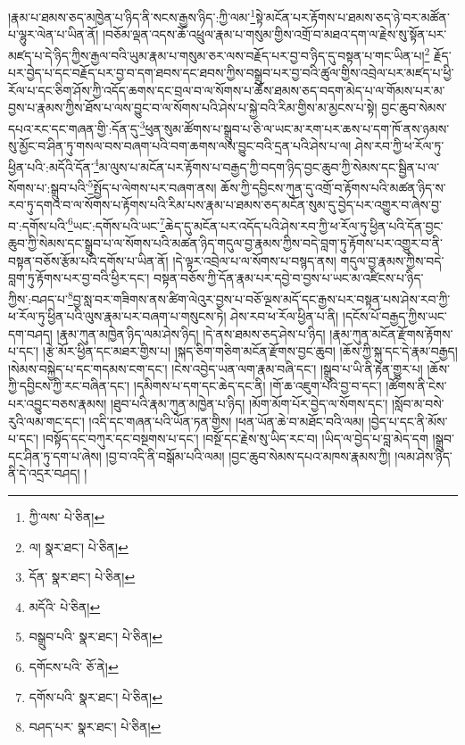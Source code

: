 །རྣམ་པ་ཐམས་ཅད་མཁྱེན་པ་ཉིད་ནི་སངས་རྒྱས་ཉིད་:ཀྱི་ལམ་\footnote{ཀྱི་ལས་  པེ་ཅིན། }སྟེ་མངོན་པར་རྟོགས་པ་ཐམས་ཅད་ཉེ་བར་མཚོན་པ་ལྷུར་ལེན་པ་ཡིན་ནོ། །བཅོམ་ལྡན་འདས་ཆོ་འཕྲུལ་རྣམ་པ་གསུམ་གྱིས་འགྲོ་བ་མཐའ་དག་ལ་རྗེས་སུ་སྟོན་པར་མཛད་པ་དེ་ཉིད་ཀྱིས་རྒྱལ་བའི་ཡུམ་རྣམ་པ་གསུམ་ཅར་ལས་བརྗོད་པར་བྱ་བ་ཉིད་དུ་བསྟན་པ་གང་ཡིན་པ།\footnote{ལ།  སྣར་ཐང་།  པེ་ཅིན། } རྗོད་པར་བྱེད་པ་དང་བརྗོད་པར་བྱ་བ་དག་ཐབས་དང་ཐབས་ཀྱིས་བསྒྲུབ་པར་བྱ་བའི་ཚུལ་གྱིས་འབྲེལ་པར་མཛད་པ་ཕྱི་རོལ་པ་དང་ཅིག་ཤོས་ཀྱི་འདོད་ཆགས་དང་བྲལ་བ་ལ་སོགས་པ་ཆོས་ཐམས་ཅད་བདག་མེད་པ་ལ་གོམས་པར་མ་བྱས་པ་རྣམས་ཀྱིས་ཐོས་པ་ལས་བྱུང་བ་ལ་སོགས་པའི་ཤེས་པ་སྐྱེ་བའི་རིམ་གྱིས་མ་མྱངས་པ་སྟེ། བྱང་ཆུབ་སེམས་དཔའ་རང་དང་གཞན་གྱི་:དོན་དུ་\footnote{དོན་  སྣར་ཐང་།  པེ་ཅིན། }ཕུན་སུམ་ཚོགས་པ་སྒྲུབ་པ་ཅི་ལ་ཡང་མ་རག་པར་ཆས་པ་དག་ཁོ་ནས་ཉམས་སུ་མྱོང་བ་ཤིན་ཏུ་གསལ་བས་བཞག་པའི་བག་ཆགས་ལས་བྱུང་བའི་དྲན་པའི་ཤེས་པ་ལ། ཤེས་རབ་ཀྱི་ཕ་རོལ་ཏུ་ཕྱིན་པའི་:མདོའི་དོན་\footnote{མདོའི་  པེ་ཅིན། }མ་ལུས་པ་མངོན་པར་རྟོགས་པ་བརྒྱད་ཀྱི་བདག་ཉིད་བྱང་ཆུབ་ཀྱི་སེམས་དང་སྦྱིན་པ་ལ་སོགས་པ་:སྒྲུབ་པའི་\footnote{བསྒྲུབ་པའི་  སྣར་ཐང་།  པེ་ཅིན། }སྤྱོད་པ་ལེགས་པར་བཞག་ནས། ཆོས་ཀྱི་དབྱིངས་ཀུན་དུ་འགྲོ་བ་རྟོགས་པའི་མཚན་ཉིད་ས་རབ་ཏུ་དགའ་བ་ལ་སོགས་པ་རྟོགས་པའི་རིམ་པས་རྣམ་པ་ཐམས་ཅད་མངོན་སུམ་དུ་བྱེད་པར་འགྱུར་བ་ཞེས་བྱ་བ་:དགོས་པའི་\footnote{དགོངས་པའི་  ཅོ་ནེ། }ཡང་:དགོས་པའི་ཡང་\footnote{དགོས་པའི་  སྣར་ཐང་།  པེ་ཅིན། }ཆེད་དུ་མངོན་པར་འདོད་པའི་ཤེས་རབ་ཀྱི་ཕ་རོལ་ཏུ་ཕྱིན་པའི་དོན་བྱང་ཆུབ་ཀྱི་སེམས་དང་སྒྲུབ་པ་ལ་སོགས་པའི་མཚན་ཉིད་གདུལ་བྱ་རྣམས་ཀྱིས་བདེ་བླག་ཏུ་རྟོགས་པར་འགྱུར་བ་ནི་བསྟན་བཅོས་རྩོམ་པའི་དགོས་པ་ཡིན་ནོ། །དེ་ལྟར་འབྲེལ་པ་ལ་སོགས་པ་བསྙད་ནས། གདུལ་བྱ་རྣམས་ཀྱིས་བདེ་བླག་ཏུ་རྟོགས་པར་བྱ་བའི་ཕྱིར་དང་། བསྟན་བཅོས་ཀྱི་དོན་རྣམ་པར་དབྱེ་བ་བྱས་པ་ཡང་མ་འཛིངས་པ་ཉིད་ཀྱིས་:བཤད་པ་\footnote{བཤད་པར་  སྣར་ཐང་།  པེ་ཅིན། }བྱ་སླ་བར་གཟིགས་ནས་ཚིག་ལེའུར་བྱས་པ་བཅོ་ལྔས་མདོ་དང་རྒྱས་པར་བསྟན་པས་ཤེས་རབ་ཀྱི་ཕ་རོལ་ཏུ་ཕྱིན་པའི་ལུས་རྣམ་པར་བཞག་པ་གསུངས་ཏེ། ཤེས་རབ་ཕ་རོལ་ཕྱིན་པ་ནི། །དངོས་པོ་བརྒྱད་ཀྱིས་ཡང་དག་བཤད། །རྣམ་ཀུན་མཁྱེན་ཉིད་ལམ་ཤེས་ཉིད། །དེ་ནས་ཐམས་ཅད་ཤེས་པ་ཉིད། །རྣམ་ཀུན་མངོན་རྫོགས་རྟོགས་པ་དང་། །རྩེ་མོར་ཕྱིན་དང་མཐར་གྱིས་པ། །སྐད་ཅིག་གཅིག་མངོན་རྫོགས་བྱང་ཆུབ། །ཆོས་ཀྱི་སྐུ་དང་དེ་རྣམ་བརྒྱད། །སེམས་བསྐྱེད་པ་དང་གདམས་ངག་དང་། །ངེས་འབྱེད་ཡན་ལག་རྣམ་བཞི་དང་། །སྒྲུབ་པ་ཡི་ནི་རྟེན་གྱུར་པ། །ཆོས་ཀྱི་དབྱིངས་ཀྱི་རང་བཞིན་དང་། །དམིགས་པ་དག་དང་ཆེད་དང་ནི། །གོ་ཆ་འཇུག་པའི་བྱ་བ་དང་། །ཚོགས་ནི་ངེས་པར་འབྱུང་བཅས་རྣམས། །ཐུབ་པའི་རྣམ་ཀུན་མཁྱེན་པ་ཉིད། །མོག་མོག་པོར་བྱེད་ལ་སོགས་དང་། །སློབ་མ་བསེ་རུའི་ལམ་གང་དང་། །འདི་དང་གཞན་པའི་ཡོན་ཏན་གྱིས། །ཕན་ཡོན་ཆེ་བ་མཐོང་བའི་ལམ། །བྱེད་པ་དང་ནི་མོས་པ་དང་། །བསྟོད་དང་བཀུར་དང་བསྔགས་པ་དང་། །བསྔོ་དང་རྗེས་སུ་ཡིད་རང་བ། །ཡིད་ལ་བྱེད་པ་བླ་མེད་དག །སྒྲུབ་དང་ཤིན་ཏུ་དག་པ་ཞེས། །བྱ་བ་འདི་ནི་བསྒོམ་པའི་ལམ། །བྱང་ཆུབ་སེམས་དཔའ་མཁས་རྣམས་ཀྱི། །ལམ་ཤེས་ཉིད་ནི་དེ་འདྲར་བཤད། །
